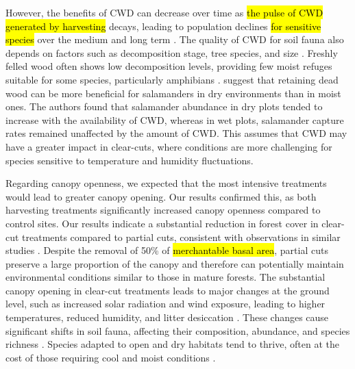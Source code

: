 However, the benefits of CWD can decrease over time as \hl{the pulse of CWD generated by harvesting} decays, leading to population declines \hl{for sensitive species} over the medium and long term \citep{Ochs2022Responseterrestrial}. 
The quality of CWD for soil fauna also depends on factors such as decomposition stage, tree species, and size \citep{Bunnell2010woodbiodiversity}. 
Freshly felled wood often shows low decomposition levels, providing few moist refuges suitable for some species, particularly amphibians \citep{Petranka1994Effectstimber,Morneault2004effectshelterwood,Owens2008Amphibianreptile,Otto2013Amphibianresponse}. 
\cite{Petranka1994Effectstimber} suggest that retaining dead wood can be more beneficial for salamanders in dry environments than in moist ones. 
The authors found that salamander abundance in dry plots tended to increase with the availability of CWD, whereas in wet plots, salamander capture rates remained unaffected by the amount of CWD. 
This assumes that CWD may have a greater impact in clear-cuts, where conditions are more challenging for species sensitive to temperature and humidity fluctuations.
 
Regarding canopy openness, we expected that the most intensive treatments would lead to greater canopy opening. 
Our results confirmed this, as both harvesting treatments significantly increased canopy openness compared to control sites. 
Our results indicate a substantial reduction in forest cover in clear-cut treatments compared to partial cuts, consistent with observations in similar studies \citep{Nolet2018Comparingeffects,Mazerolle2021Woodlandsalamander}. 
Despite the removal of 50\% of \hl{merchantable basal area}, partial cuts preserve a large proportion of the canopy and therefore can potentially maintain environmental conditions similar to those in mature forests. 
The substantial canopy opening in clear-cut treatments leads to major changes at the ground level, such as increased solar radiation and wind exposure, leading to higher temperatures, reduced humidity, and litter desiccation \citep{Keenan1993ecologicaleffects,Chen1999MicroclimateForest,Lindo2003Microbialbiomass,Brooks2008Forestfloor}. 
These changes cause significant shifts in soil fauna, affecting their composition, abundance, and species richness \citep{Staab2023Insectdecline}. 
Species adapted to open and dry habitats tend to thrive, often at the cost of those requiring cool and moist conditions \citep{Niemela2007effectsforestry,Ochs2022Responseterrestrial,Staab2023Insectdecline}.

